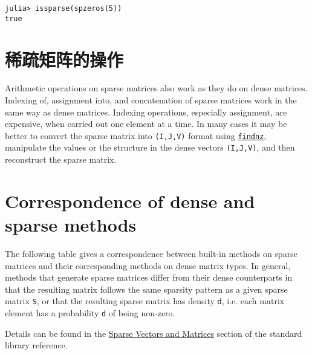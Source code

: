 \begin{verbatim}
julia> issparse(spzeros(5))
true
\end{verbatim}



\hypertarget{16554788793770073287}{}


\section{稀疏矩阵的操作}



Arithmetic operations on sparse matrices also work as they do on dense matrices. Indexing of, assignment into, and concatenation of sparse matrices work in the same way as dense matrices. Indexing operations, especially assignment, are expensive, when carried out one element at a time. In many cases it may be better to convert the sparse matrix into \texttt{(I,J,V)} format using \hyperlink{15430174447643444721}{\texttt{findnz}}, manipulate the values or the structure in the dense vectors \texttt{(I,J,V)}, and then reconstruct the sparse matrix.



\hypertarget{3328350436064607795}{}


\section{Correspondence of dense and sparse methods}



The following table gives a correspondence between built-in methods on sparse matrices and their corresponding methods on dense matrix types. In general, methods that generate sparse matrices differ from their dense counterparts in that the resulting matrix follows the same sparsity pattern as a given sparse matrix \texttt{S}, or that the resulting sparse matrix has density \texttt{d}, i.e. each matrix element has a probability \texttt{d} of being non-zero.



Details can be found in the \hyperlink{2592358466672034664}{Sparse Vectors and Matrices} section of the standard library reference.




